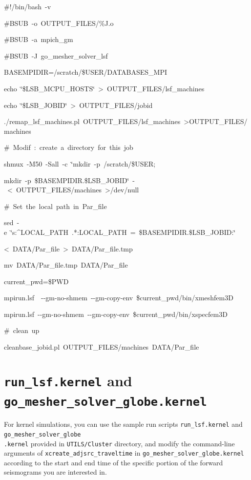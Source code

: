 \documentclass[oneside,english]{book}
\newenvironment{lyxcode}
{\begin{list}{}{
\setlength{\rightmargin}{\leftmargin}
\setlength{\listparindent}{0pt}%
\raggedright
\setlength{\itemsep}{0pt}
\setlength{\parsep}{0pt}
\normalfont\ttfamily}%
 \item[]}
{\end{list}}
\begin{document}
\begin{lyxcode}
\#!/bin/bash~-v

\#BSUB~-o~OUTPUT\_FILES/\%J.o

\#BSUB~-a~mpich\_gm

\#BSUB~-J~go\_mesher\_solver\_lsf

BASEMPIDIR=/scratch/\$USER/DATABASES\_MPI

echo~\char`\"{}\$LSB\_MCPU\_HOSTS\char`\"{}~>~OUTPUT\_FILES/lsf\_machines

echo~\char`\"{}\$LSB\_JOBID\char`\"{}~>~OUTPUT\_FILES/jobid

./remap\_lsf\_machines.pl~OUTPUT\_FILES/lsf\_machines~>OUTPUT\_FILES/machines

\#~Modif~:~create~a~directory~for~this~job

shmux~-M50~-Sall~-c~\char`\"{}mkdir~-p~/scratch/\$USER;

mkdir~-p~\$BASEMPIDIR.\$LSB\_JOBID\char`\"{}~-~<~OUTPUT\_FILES/machines~>/dev/null

\#~Set~the~local~path~in~Par\_file

sed~-e~\char`\"{}s:\textasciicircum{}LOCAL\_PATH~.{*}:LOCAL\_PATH~=~\$BASEMPIDIR.\$LSB\_JOBID:\char`\"{}

<~DATA/Par\_file~>~DATA/Par\_file.tmp

mv~DATA/Par\_file.tmp~DATA/Par\_file

current\_pwd=\$PWD

mpirun.lsf~~-{}-gm-no-shmem~-{}-gm-copy-env~\$current\_pwd/bin/xmeshfem3D

mpirun.lsf~-{}-gm-no-shmem~-{}-gm-copy-env~\$current\_pwd/bin/xspecfem3D

\#~clean~up

cleanbase\_jobid.pl~OUTPUT\_FILES/machines~DATA/Par\_file
\end{lyxcode}

\section{\texttt{run\_lsf.kernel} and \texttt{go\_mesher\_solver\_globe.kernel}}

For kernel simulations, you can use the sample run scripts \texttt{run\_lsf.kernel}
and \texttt{go\_mesher\_solver\_globe}~\\
\texttt{.kernel} provided in \texttt{UTILS/Cluster} directory, and modify
the command-line arguments of \texttt{xcreate\_adjsrc\_traveltime} in
\texttt{go\_mesher\_solver\_globe.kernel} according to the start and end time
of the specific portion of the forward seismograms you are interested
in.
\end{document}

